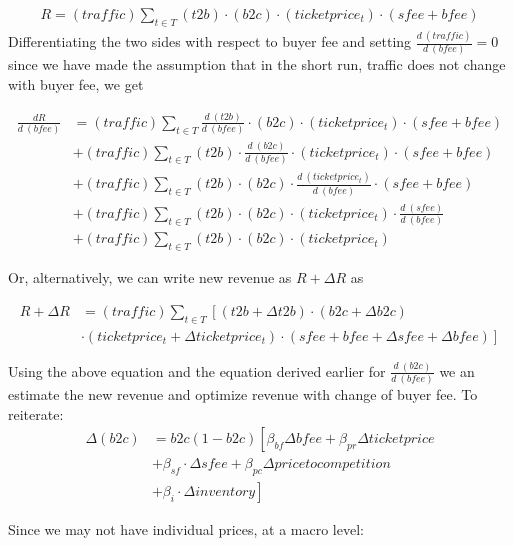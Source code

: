 \documentclass[letterpaper, 12pt]{article}
\begin{document}
\begin{align*}
	R =  (traffic) \sum_{t\in T} (t2b) \cdot (b2c) \cdot (ticketprice_t) \cdot (sfee + bfee)
\end{align*}
Differentiating the two sides with respect to buyer fee and setting $\frac{d\ (traffic)}{d\ (bfee)} =0$ since we have made the assumption that in the short run, traffic does not change with buyer fee, we get

\begin{align*}
	\frac{dR}{d\ (bfee)} &=(traffic) \sum_{t\in T} \frac{d\ (t2b) }{d\ (bfee)}\cdot (b2c) \cdot (ticketprice_t) \cdot (sfee + bfee)\\
&+ (traffic) \sum_{t\in T} (t2b) \cdot \frac{d\ (b2c) }{d\ (bfee)}\cdot (ticketprice_t) \cdot (sfee + bfee)\\
&+ (traffic) \sum_{t\in T} (t2b) \cdot (b2c)  \cdot \frac{d\ (ticketprice_t)}{d\ (bfee)} \cdot (sfee + bfee)\\
&+ (traffic) \sum_{t\in T}(t2b) \cdot (b2c) \cdot (ticketprice_t)  \cdot \frac{d\ (sfee)}{d\ (bfee)} \\
&+ (traffic) \sum_{t\in T} (t2b) \cdot (b2c) \cdot (ticketprice_t)
\end{align*}

Or, alternatively, we can write new revenue as $R+\Delta R$ as

\begin{align*}
	R +\Delta R &= (traffic) \sum_{t\in T} \left[ (t2b+\Delta t2b) \cdot (b2c + \Delta b2c)\right.\\
		&\left. \cdot (ticketprice_t+ \Delta ticketprice_t) \cdot (sfee + bfee + \Delta sfee + \Delta bfee)\right]
\end{align*}

Using the above equation and the equation derived earlier for $\frac{d\ (b2c)}{d\ (bfee)}$ we an estimate the new revenue and optimize revenue with change of buyer fee. To reiterate:
\begin{align*}
\Delta (b2c) &=	b2c(1-b2c)\left[  \beta_{bf}\Delta bfee + \beta_{pr}  \Delta ticketprice \right.\\
&		 + \beta_{sf} \cdot \Delta sfee + \beta_{pc} \Delta pricetocompetition \\
&		 + \left. \beta_i \cdot \Delta inventory\right]
\end{align*}

Since we may not have individual prices, at a macro level:
\end{document}
